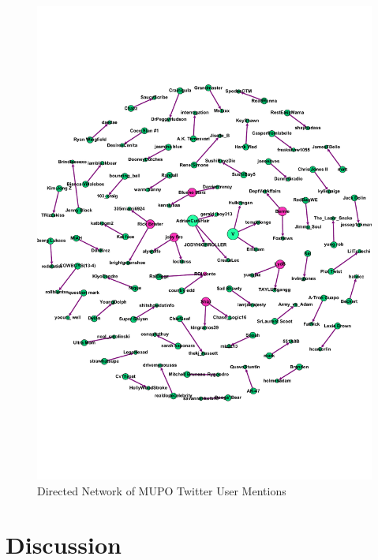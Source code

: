 \documentclass[sigconf]{acmart}
\begin{document}
\begin{figure}[!ht]
  \centering\includegraphics[width=\columnwidth]{images/Figure9.pdf}
  \caption{Directed Network of MUPO Twitter User Mentions}
  \label{f:Figure9}
\end{figure}

\section{Discussion}
\end{document}
